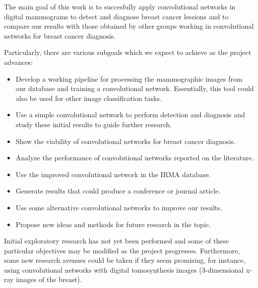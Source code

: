 The main goal of this work is to succesfully apply convolutional networks in digital mammograms to detect and diagnose breast cancer lessions and to compare our results with those obtained by other groups working in convolutional networks for breast cancer diagnosis.

Particularly, there are various subgoals which we expect to achieve as the project advances:
\begin{itemize}
	\item Develop a working pipeline for processing the mammographic images from our database and training a convolutional network. Essentially, this tool could also be used for other image classification tasks.
	\item Use a simple convolutional network to perform detection and diagnosis and study these initial results to guide further research.
	\item Show the viability of convolutional networks for breast cancer diagnosis.
	\item Analyze the performance of convolutional networks reported on the literature.
	\item Use the improved convolutional network in the IRMA database.
	\item Generate results that could produce a conference or journal article.
	\item Use some alternative convolutional networks to improve our results.
	\item Propose new ideas and methods for future research in the topic.
\end{itemize}
Initial exploratory research has not yet been performed and some of these particular objectives may be modified as the project progresses. Furthermore, some new research avenues could be taken if they seem promising, for instance, using convolutional networks with digital tomosynthesis images (3-dimensional x-ray images of the breast).


